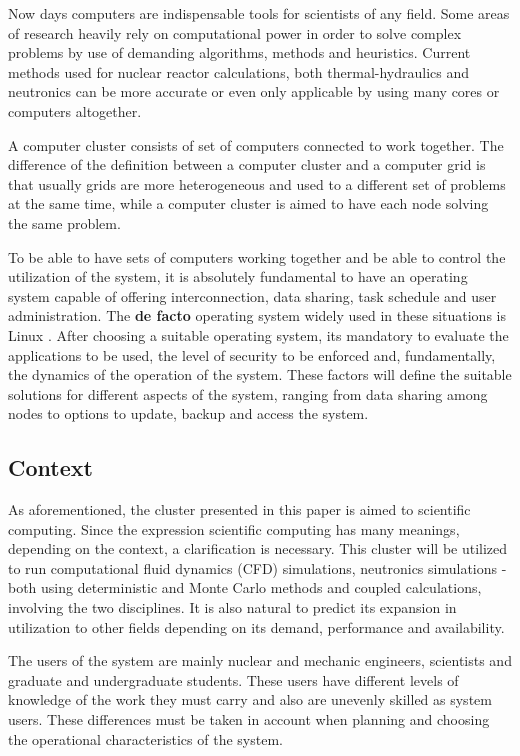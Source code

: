 \documentclass[twoside,a4paper,12pt,english]{inac17}
\begin{document}
Now days computers are indispensable tools for scientists of any field.
Some areas of research heavily rely on computational power in order to solve
complex problems by use of demanding algorithms, methods and heuristics.
Current methods used for nuclear reactor calculations, both thermal-hydraulics
and neutronics can be more accurate or even only applicable by using
many cores or computers altogether.

A computer cluster consists of set of computers connected to work together. The difference of the
definition between a computer cluster and a computer grid is that usually grids are more
heterogeneous and used to a different set of problems at the same time, while a computer
cluster is aimed to have each node solving the same problem.

To be able to have sets of computers working together and be able to control the utilization of the system,
it is absolutely fundamental to have an operating system capable of offering interconnection, data sharing,
task schedule and user administration. The \textbf{de facto} operating system widely used in these situations
is Linux \cite{Linux}. After choosing a suitable operating system, its mandatory to evaluate the applications to
be used, the level of security to be enforced and, fundamentally, the dynamics of the operation of the system.
These factors will define the suitable solutions for different aspects of the system, ranging from data
sharing among nodes to options to update, backup and access the system.



\subsection{Context}

As aforementioned, the cluster presented in this paper is aimed to scientific computing.
Since the expression scientific computing has many meanings, depending on the context, a
clarification is necessary. This cluster will be utilized to run computational fluid dynamics
(CFD) simulations, neutronics simulations - both using deterministic and Monte Carlo \cite{MC}
methods and coupled calculations, involving the two disciplines. It is also natural to predict
its expansion in utilization to other fields depending on its demand, performance and availability.

The users of the system are mainly nuclear and mechanic engineers, scientists and graduate
and undergraduate students. These users have different levels of knowledge of the work
they must carry and also are unevenly skilled as system users. These differences must be taken
in account when planning and choosing the operational characteristics of the system.
\end{document}
